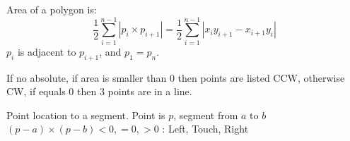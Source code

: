 Area of a polygon is:
$$\frac{1}{2} \sum_{i = 1}^{n - 1} |p_i \times p_{i+1}| = \frac{1}{2}\sum_{i = 1}^{n - 1} |x_i y_{i+1} - x_{i+1}y_i|$$ $p_i$ is adjacent to $p_{i+1}$, and $p_1 = p_n$.

If no absolute, if area is smaller than 0 then points are listed CCW, otherwise CW, if equals 0 then 3 points are in a line. 


Point location to a segment. Point is $p$, segment from $a$ to $b$
$(p - a) \times (p - b) < 0, =0, >0$ : Left, Touch, Right
